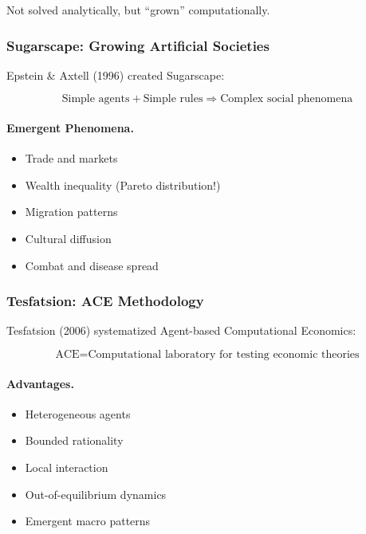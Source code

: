 Not solved analytically, but ``grown'' computationally.

\subsubsection{Sugarscape: Growing Artificial Societies}

Epstein \& Axtell (1996) created Sugarscape:

\begin{equation}
\text{Simple agents} + \text{Simple rules} \Rightarrow \text{Complex social phenomena}
\end{equation}

\paragraph{Emergent Phenomena.}
\begin{itemize}
    \item Trade and markets
    \item Wealth inequality (Pareto distribution!)
    \item Migration patterns
    \item Cultural diffusion
    \item Combat and disease spread
\end{itemize}

\subsubsection{Tesfatsion: ACE Methodology}

Tesfatsion (2006) systematized Agent-based Computational Economics:

\begin{equation}
\text{ACE} = \text{Computational laboratory for testing economic theories}
\end{equation}

\paragraph{Advantages.}
\begin{itemize}
    \item Heterogeneous agents
    \item Bounded rationality
    \item Local interaction
    \item Out-of-equilibrium dynamics
    \item Emergent macro patterns
\end{itemize}

